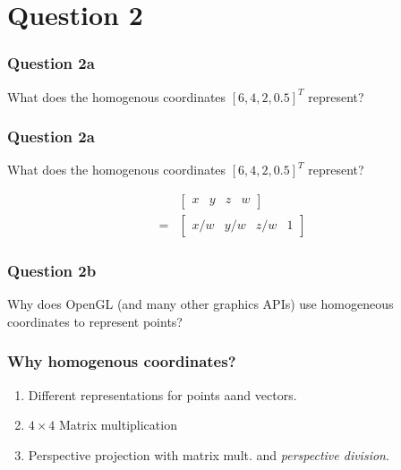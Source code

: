 \documentclass{beamer}
\begin{document}
\section{Question 2}

\begin{frame}
    \frametitle{Question 2a}

    What does the homogenous coordinates $[6, 4, 2, 0.5]^T$ represent?

\end{frame}

\begin{frame}
    \frametitle{Question 2a}

    What does the homogenous coordinates $[6, 4, 2, 0.5]^T$ represent?

    \begin{tcolorbox}
        \begin{eqnarray*}
            & \left[
            \begin{matrix}
                x & y & z & w
            \end{matrix} 
            \right]\\
            = & \left[
            \begin{matrix}
                x/w & y/w & z/w & 1
            \end{matrix}
            \right]
        \end{eqnarray*}
    \end{tcolorbox}
    

\end{frame}

\begin{frame}
    \frametitle{Question 2b}

    Why does OpenGL (and many other graphics APIs) use homogeneous coordinates to represent points?

\end{frame}

\begin{frame}
    \frametitle{Why homogenous coordinates?}

    \begin{enumerate}
        \item Different representations for points aand vectors.
        \item $4 \times 4$ Matrix multiplication
        \item Perspective projection with matrix mult. and \textit{perspective division}.
    \end{enumerate}
    
\end{frame}
\end{document}
